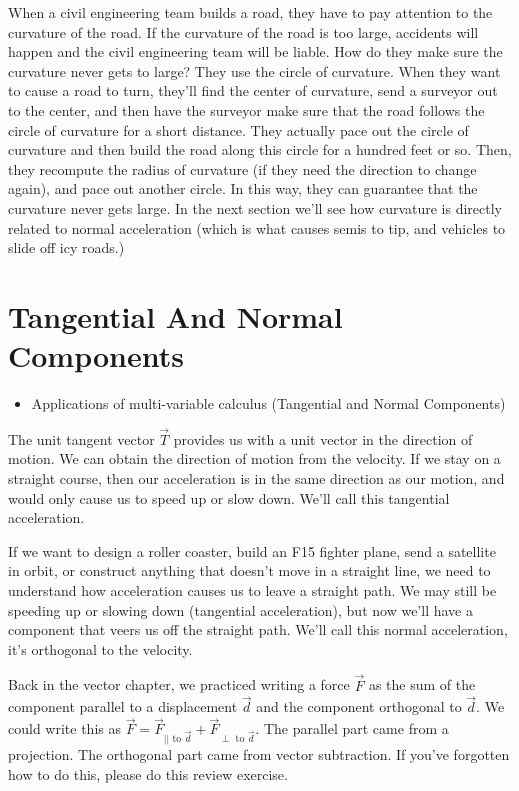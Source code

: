 \indent When a civil engineering team builds a road, they have to pay attention to the curvature of the road.  If the curvature of the road is too large, accidents will happen and the civil engineering team will be liable. How do they make sure the curvature never gets to large?  They use the circle of curvature. When they want to cause a road to turn, they'll find the center of curvature, send a surveyor out to the center, and then have the surveyor make sure that the road follows the circle of curvature for a short distance. They actually pace out the circle of curvature and then build the road along this circle for a hundred feet or so.  Then, they recompute the radius of curvature (if they need the direction to change again), and pace out another circle.  In this way, they can guarantee that the curvature never gets large. In the next section we'll see how curvature is directly related to normal acceleration (which is what causes semis to tip, and vehicles to slide off icy roads.)





\section{Tangential And Normal Components}
\begin{itemize}
\item Applications of multi-variable calculus (Tangential and Normal Components) 
\end{itemize}


\indent The unit tangent vector $\vec T$ provides us with a unit vector in the direction of motion. We can obtain the direction of motion from the velocity. If we stay on a straight course, then our acceleration is in the same direction as our motion, and would only cause us to speed up or slow down. We'll call this tangential acceleration.

\indent If we want to design a roller coaster, build an F15 fighter plane, send a satellite in orbit, or construct anything that doesn't move in a straight line, we need to understand how acceleration causes us to leave a straight path. We may still be speeding up or slowing down (tangential acceleration), but now we'll have a component that veers us off the straight path.  We'll call this normal acceleration, it's orthogonal to the velocity. 

\indent Back in the vector chapter, we practiced writing a force $\vec F$ as the sum of the component parallel to a displacement $\vec d$ and the component orthogonal to $\vec d$.  We could write this as $\vec F = \vec F_{|| \text{ to }\vec d} + \vec F_{\perp \text{ to }\vec d}.$ The parallel part came from a projection.  The orthogonal part came from vector subtraction.  If you've forgotten how to do this, please do this review exercise.

